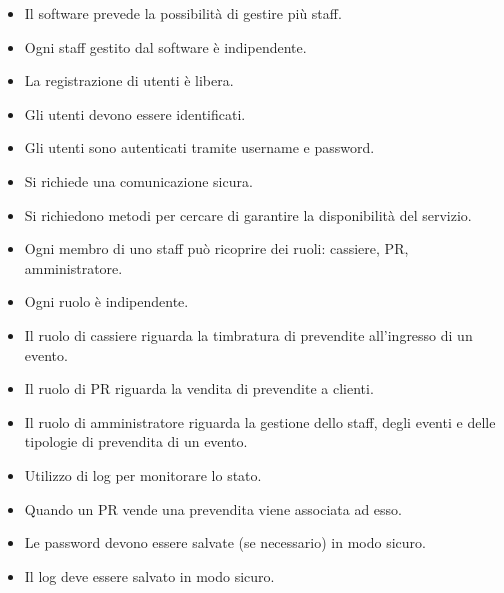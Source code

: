 \documentclass{article}
\begin{document}
\begin{itemize}
	

    \item Il software prevede la possibilità di gestire più staff.
    \item Ogni staff gestito dal software è indipendente.
    \item La registrazione di utenti è libera.
    
	
	\item Gli utenti devono essere identificati.
	
    \item Gli utenti sono autenticati tramite username e password.
    	
    \item Si richiede una comunicazione sicura.
    \item Si richiedono metodi per cercare di garantire la disponibilità del servizio.
    
    \item Ogni membro di uno staff può ricoprire dei ruoli: cassiere, PR, amministratore.
    \item Ogni ruolo è indipendente.
    
    \item Il ruolo di cassiere riguarda la timbratura di prevendite all'ingresso di un evento.
    \item Il ruolo di PR riguarda la vendita di prevendite a clienti.
    \item Il ruolo di amministratore riguarda la gestione dello staff, degli eventi e delle tipologie di prevendita di un evento.
	
	\item Utilizzo di log per monitorare lo stato.
	
	
	\item Quando un PR vende una prevendita viene associata ad esso.
	
	\item Le password devono essere salvate (se necessario) in modo sicuro.
	\item Il log deve essere salvato in modo sicuro.
	
    

\end{itemize}
\end{document}
